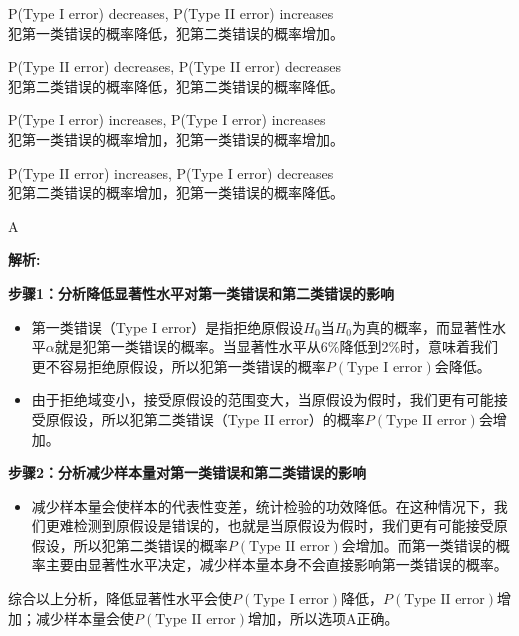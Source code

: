 \documentclass{article}
\newenvironment{explanation}
{\textbf{解析:}\par}
{\par}
\begin{document}
    \begin{choices}
        \item P(Type I error) decreases, P(Type II error) increases\\
        犯第一类错误的概率降低，犯第二类错误的概率增加。
        \item P(Type II error) decreases, P(Type II error) decreases\\
        犯第二类错误的概率降低，犯第二类错误的概率降低。
        \item P(Type I error) increases, P(Type I error) increases\\
        犯第一类错误的概率增加，犯第一类错误的概率增加。
        \item P(Type II error) increases, P(Type I error) decreases\\
        犯第二类错误的概率增加，犯第一类错误的概率降低。
    \end{choices}
    
    \begin{correctanswer}
        A
    \end{correctanswer}
    
    \begin{explanation}
    \textbf{步骤1：分析降低显著性水平对第一类错误和第二类错误的影响}
    \begin{itemize}
    \item 第一类错误（Type I error）是指拒绝原假设\(H_0\)当\(H_0\)为真的概率，而显著性水平\(\alpha\)就是犯第一类错误的概率。当显著性水平从\(6\%\)降低到\(2\%\)时，意味着我们更不容易拒绝原假设，所以犯第一类错误的概率\(P(\text{Type I error})\)会降低。
    \item 由于拒绝域变小，接受原假设的范围变大，当原假设为假时，我们更有可能接受原假设，所以犯第二类错误（Type II error）的概率\(P(\text{Type II error})\)会增加。
    \end{itemize}
    \textbf{步骤2：分析减少样本量对第一类错误和第二类错误的影响}
    \begin{itemize}
    \item 减少样本量会使样本的代表性变差，统计检验的功效降低。在这种情况下，我们更难检测到原假设是错误的，也就是当原假设为假时，我们更有可能接受原假设，所以犯第二类错误的概率\(P(\text{Type II error})\)会增加。而第一类错误的概率主要由显著性水平决定，减少样本量本身不会直接影响第一类错误的概率。
    \end{itemize}
    综合以上分析，降低显著性水平会使\(P(\text{Type I error})\)降低，\(P(\text{Type II error})\)增加；减少样本量会使\(P(\text{Type II error})\)增加，所以选项A正确。
    \end{explanation}
    
\end{document}
